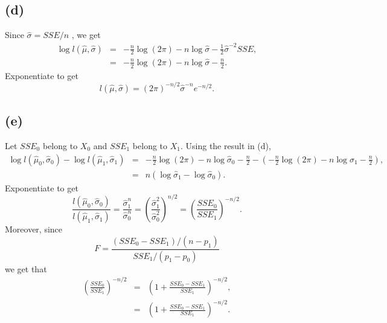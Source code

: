 \subsection*{(d)}
Since $\hat{\sigma}=SSE/n$ , we get
\begin{eqnarray*}
\log l(\hat{\mu},\hat{\sigma}) & = & -\frac{n}{2}\log(2\pi)-n\log\hat{\sigma}-\frac{1}{2}\hat{\sigma}^{-2}SSE,\\
 & = & -\frac{n}{2}\log(2\pi)-n\log\hat{\sigma}-\frac{n}{2}.
\end{eqnarray*}
Exponentiate to get 
\[
l(\hat{\mu},\hat{\sigma})=(2\pi)^{-n/2}\hat{\sigma}^{-n}e^{-n/2}.
\]

\subsection*{(e)}
Let $SSE_{0}$ belong to $X_{0}$ and $SSE_{1}$ belong to $X_{1}$.
Using the result in (d), 
\begin{eqnarray*}
\log l(\hat{\mu}_{0},\hat{\sigma}_{0})-\log l(\hat{\mu}_{1},\hat{\sigma}_{1}) & = & -\frac{n}{2}\log(2\pi)-n\log\hat{\sigma}_{0}-\frac{n}{2}-(-\frac{n}{2}\log(2\pi)-n\log\hat{\sigma}_{1}-\frac{n}{2}),\\
 & = & n(\log\hat{\sigma}_{1}-\log\hat{\sigma}_{0}).
\end{eqnarray*}
Exponentiate to get 
\[
\frac{l(\hat{\mu}_{0},\hat{\sigma}_{0})}{l(\hat{\mu}_{1},\hat{\sigma}_{1})}=\frac{\hat{\sigma}_{1}^{n}}{\hat{\sigma}_{0}^{n}}=\left(\frac{\hat{\sigma}_{1}^{2}}{\hat{\sigma}_{0}^{2}}\right)^{n/2}=\left(\frac{SSE_{0}}{SSE_{1}}\right)^{-n/2}.
\]
Moreover, since
\[
F=\frac{(SSE_{0}-SSE_{1})/(n-p_{1})}{SSE_{1}/(p_{1}-p_{0})}
\]
we get that
\begin{eqnarray*}
\left(\frac{SSE_{0}}{SSE_{1}}\right)^{-n/2} & = & \left(1+\frac{SSE_{0}-SSE_{1}}{SSE_{1}}\right)^{-n/2},\\
 & = & \left(1+\frac{SSE_{0}-SSE_{1}}{SSE_{1}}\right)^{-n/2}.
\end{eqnarray*}